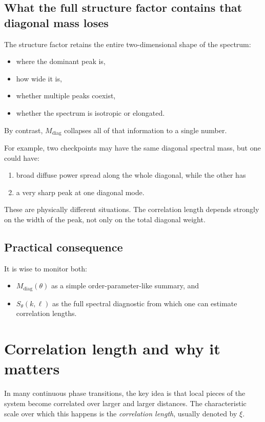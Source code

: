 \documentclass[11pt]{article}
\newcommand{\diag}{\mathrm{diag}}
\begin{document}
\subsection{What the full structure factor contains that diagonal mass loses}

The structure factor retains the entire two-dimensional shape of the spectrum:
\begin{itemize}
    \item where the dominant peak is,
    \item how wide it is,
    \item whether multiple peaks coexist,
    \item whether the spectrum is isotropic or elongated.
\end{itemize}
By contrast, $M_{\diag}$ collapses all of that information to a single number.

For example, two checkpoints may have the same diagonal spectral mass, but one could have:
\begin{enumerate}
    \item broad diffuse power spread along the whole diagonal, while the other has
    \item a very sharp peak at one diagonal mode.
\end{enumerate}
These are physically different situations. The correlation length depends strongly on the width of the peak, not only on the total diagonal weight.

\subsection{Practical consequence}

It is wise to monitor both:
\begin{itemize}
    \item $M_{\diag}(\theta)$ as a simple order-parameter-like summary, and
    \item $S_\theta(k,\ell)$ as the full spectral diagnostic from which one can estimate correlation lengths.
\end{itemize}

\section{Correlation length and why it matters}

In many continuous phase transitions, the key idea is that local pieces of the system become correlated over larger and larger distances. The characteristic scale over which this happens is the \emph{correlation length}, usually denoted by $\xi$.
\end{document}

